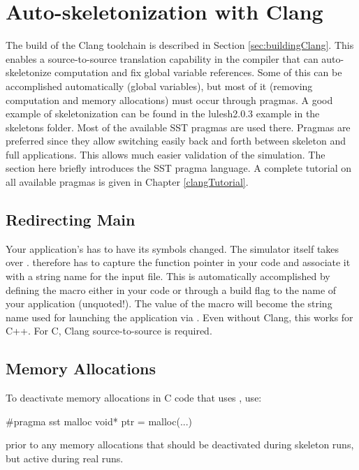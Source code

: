 \section{Auto-skeletonization with Clang}
\label{sec:autoSkeletonization}

The build of the Clang toolchain is described in Section \ref{sec:buildingClang}. 
This enables a source-to-source translation capability in the  compiler that can auto-skeletonize computation and fix global variable references.
Some of this can be accomplished automatically (global variables), but most of it (removing computation and memory allocations) must occur through pragmas.
A good example of skeletonization can be found in the lulesh2.0.3 example in the skeletons folder. Most of the available SST pragmas are used there.
Pragmas are preferred since they allow switching easily back and forth between skeleton and full applications.
This allows much easier validation of the simulation. The section here briefly introduces the SST pragma language.
A complete tutorial on all available pragmas is given in Chapter \ref{clangTutorial}.

\subsection{Redirecting Main}
Your application's  has to have its symbols changed.
The simulator itself takes over .
\sstmacro therefore has to capture the function pointer in your code and associate it with a string name for the input file.
This is automatically accomplished by defining the macro  either in your code or through a  build flag to the name of your application (unquoted!). The value of the macro will become the string name used for launching the application via .
Even without Clang, this works for C++. For C, Clang source-to-source is required.

\subsection{Memory Allocations}
To deactivate memory allocations in C code that uses , use:
\begin{CppCode}
#pragma sst malloc
  void* ptr = malloc(...)
\end{CppCode}
prior to any memory allocations that should be deactivated during skeleton runs, but active during real runs.

